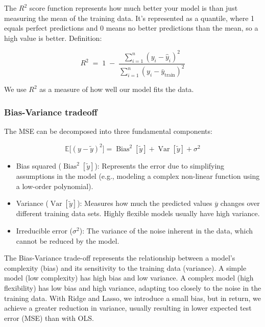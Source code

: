 \documentclass[amssymb,twocolumn,aps]{revtex4-2}
\begin{document}
The $R^2$ score function represents how much better your model is than just measuring the mean of the training data. It's represented as a quantile, where 1 equals perfect predictions and 0 means no better predictions than the mean, so a high value is better. Definition: 

\begin{equation}
    R^2 \;=\; 1 \;-\; \frac{\sum_{i=1}^n (y_i - \hat y_i)^2}{\sum_{i=1}^n (y_i - \bar y_{\text{train}})^2}
\end{equation}

We use $R^2$ as a measure of how well our model fits the data. 

\subsubsection{Bias-Variance tradeoff}
\label{subsubsec:bias_var_theory}

The MSE can be decomposed into three fundamental components: 

\begin{equation}
    \mathbb{E}\!\big[(y-\tilde y)^2\big]
= \operatorname{Bias}^2[\tilde y]
+ \operatorname{Var}[\tilde y]
+ \sigma^2
\end{equation}

\begin{itemize}
    \item Bias squared ($\operatorname{Bias}^2[\tilde y]$): Represents the error due to simplifying assumptions in the model (e.g., modeling a complex non-linear function using a low-order polynomial). 
    \item Variance ($\operatorname{Var}[\tilde y]$): Measures how much the predicted values $\overline{y}$ changes over different training data sets. Highly flexible models usually have high variance. 
    \item Irreducible error ($\sigma^2$): The variance of the noise inherent in the data, which cannot be reduced by the model. 
\end{itemize}

The Bias-Variance trade-off represents the relationship between a model's complexity (bias) and its sensitivity to the training data (variance). 
A simple model (low complexity) has high bias and low variance. 
A complex model (high flexibility) has low bias and high variance, adapting too closely to the noise in the training data. With Ridge and Lasso, we introduce a small bias, but in return, we achieve a greater reduction in variance, usually resulting in lower expected test error (MSE) than with OLS. 
\end{document}
